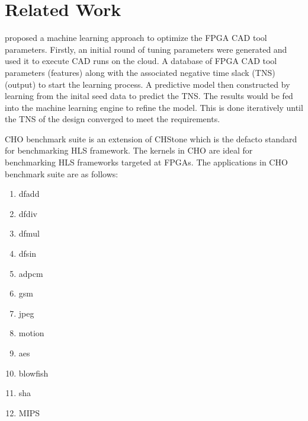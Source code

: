 \chapter{Related Work}

\cite{kapre2015driving} proposed a machine learning approach to optimize the FPGA CAD tool parameters. Firstly, an initial round of tuning parameters were generated and used it to execute CAD runs on the cloud. A database of FPGA CAD tool parameters (features) along with the associated negative time slack (TNS) (output) to start the learning process. A predictive model then constructed by learning from the inital seed data to predict the TNS. The results would be fed into the machine learning engine to refine the model. This is done iteratively until the TNS of the design converged to meet the requirements.

CHO benchmark suite \citep{ndu2015cho} is an extension of CHStone which is the defacto standard for benchmarking HLS framework. The kernels in CHO are ideal for benchmarking HLS frameworks targeted at FPGAs. The applications in CHO benchmark suite are as follows:

\begin{enumerate}
    \item dfadd
    \item dfdiv
    \item dfmul
    \item dfsin
    \item adpcm
    \item gsm
    \item jpeg
    \item motion
    \item aes
    \item blowfish
    \item sha
    \item MIPS
\end{enumerate}

